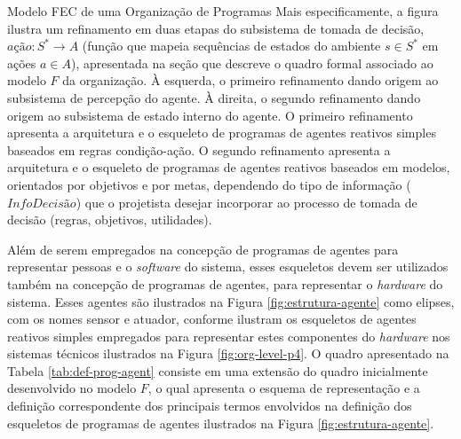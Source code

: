 \begin{section}{Modelo FEC de uma Organização de Programas}
            Mais especificamente, a figura ilustra um refinamento em duas etapas do subsistema de tomada de decisão, $ação: S^*  \rightarrow A$ (função que mapeia sequências de estados do ambiente $s \in S^*$ em ações $a \in A$), apresentada na seção que descreve o quadro formal associado ao modelo $F$ da organização. À esquerda, o primeiro refinamento dando origem ao subsistema de percepção do agente. À direita, o segundo refinamento dando origem ao subsistema de estado interno do agente. O primeiro refinamento apresenta a arquitetura e o esqueleto de programas de agentes reativos simples baseados em regras condição-ação. O segundo refinamento apresenta a arquitetura e o esqueleto de programas de agentes reativos baseados em modelos, orientados por objetivos e por metas, dependendo do tipo de informação ($InfoDecisão$) que o projetista desejar incorporar ao processo de tomada de decisão (regras, objetivos, utilidades).
            
            \begin{figure}[h!]
                \centering
            \end{figure}
            
            Além de serem empregados na concepção de programas de agentes para representar pessoas e o \textit{software} do sistema, esses esqueletos devem ser utilizados também na concepção de programas de agentes, para representar o \textit{hardware} do sistema. Esses agentes são ilustrados na Figura \ref{fig:estrutura-agente} como elipses, com os nomes sensor e atuador, conforme ilustram os esqueletos de agentes reativos simples empregados para representar estes componentes do \textit{hardware} nos sistemas técnicos ilustrados na Figura \ref{fig:org-level-p4}. O quadro apresentado na Tabela \ref{tab:def-prog-agent} consiste em uma extensão do quadro inicialmente desenvolvido no modelo $F$, o qual apresenta o esquema de representação e a definição correspondente dos principais termos envolvidos na definição dos esqueletos de programas de agentes ilustrados na Figura \ref{fig:estrutura-agente}.
            

\end{section}
